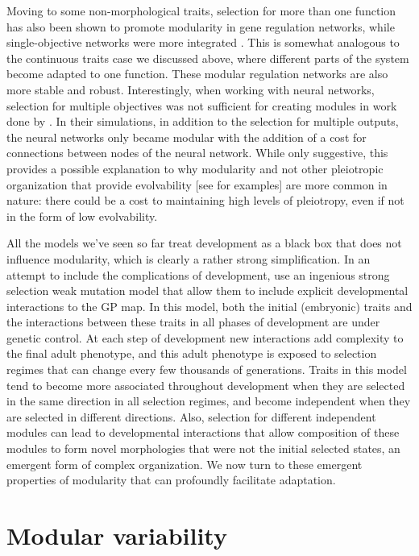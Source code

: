 \begin{refsection}
Moving to some non-morphological traits, selection for more than one
function has also been shown to promote modularity in gene regulation
networks, while single-objective networks were more integrated
\parencite{Espinosa-Soto2010-tw}. This is somewhat analogous to the
continuous traits case we discussed above, where different parts of the
system become adapted to one function. These modular regulation networks
are also more stable and robust. Interestingly, when working with neural
networks, selection for multiple objectives was not sufficient for
creating modules in work done by \textcite{Clune2012-ha}. In their simulations, in
addition to the selection for multiple outputs, the neural networks only
became modular with the addition of a cost for connections between nodes
of the neural network. While only suggestive, this provides a possible
explanation to why modularity and not other pleiotropic organization
that provide evolvability {[}see \textcite{Pavlicev2011-xm} for examples{]} are
more common in nature: there could be a cost to maintaining high levels
of pleiotropy, even if not in the form of low evolvability.

All the models we've seen so far treat development as a black box that
does not influence modularity, which is clearly a rather strong
simplification. In an attempt to include the complications of
development, \textcite{Watson2014-pi} use an ingenious strong selection weak
mutation model that allow them to include explicit developmental
interactions to the GP map. In this model, both the initial (embryonic)
traits and the interactions between these traits in all phases of
development are under genetic control. At each step of development new
interactions add complexity to the final adult phenotype, and this adult
phenotype is exposed to selection regimes that can change every few
thousands of generations. Traits in this model tend to become more
associated throughout development when they are selected in the same
direction in all selection regimes, and become independent when they are
selected in different directions. Also, selection for different
independent modules can lead to developmental interactions that allow
composition of these modules to form novel morphologies that were not
the initial selected states, an emergent form of complex organization.
We now turn to these emergent properties of modularity that can
profoundly facilitate adaptation.

\section{Modular variability}


\end{refsection}
